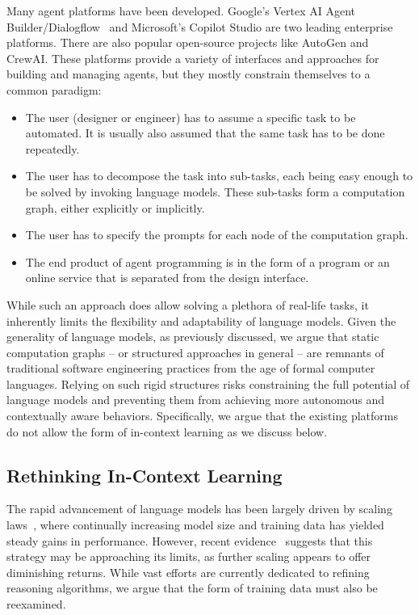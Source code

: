 Many agent platforms have been developed.  Google's Vertex AI Agent Builder/Dialogflow~\cite{vertex24} and Microsoft's Copilot Studio\cite{azure24} are two leading enterprise platforms.  There are also popular open-source projects like AutoGen\cite{autogen} and CrewAI\cite{crewai}.  These platforms provide a variety of interfaces and approaches for building and managing agents, but they mostly constrain themselves to a common paradigm:
\begin{itemize}
    \item The user (designer or engineer) has to assume a specific task to be automated.  It is usually also assumed that the same task has to be done repeatedly.
    \item The user has to decompose the task into sub-tasks, each being easy enough to be solved by invoking language models.  These sub-tasks form a computation graph, either explicitly or implicitly.
    \item The user has to specify the prompts for each node of the computation graph.
    \item The end product of agent programming is in the form of a program or an online service that is separated from the design interface.
\end{itemize}
While such an approach does allow solving a plethora of real-life tasks, it inherently limits the flexibility and adaptability of language models.
Given the generality of language models, as previously discussed, we argue that static computation graphs -- or structured approaches in general -- are remnants of traditional software engineering practices from the age of formal computer languages. Relying on such rigid structures risks constraining the full potential of language models and preventing them from achieving more autonomous and contextually aware behaviors.  Specifically, we argue that the existing platforms do not allow the form of in-context learning as we discuss below.

\subsection{Rethinking In-Context Learning}

The rapid advancement of language models has been largely driven by scaling laws~\cite{kaplan20}, where continually increasing model size and training data has yielded steady gains in performance. However, recent evidence~\cite{reuters24} suggests that this strategy may be approaching its limits, as further scaling appears to offer diminishing returns.  
While vast efforts are currently dedicated to refining reasoning algorithms, we argue that the form of training data must also be reexamined. 

